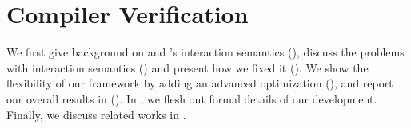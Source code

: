 \chapter{\;\;\;\;Compiler Verification}
\label{sec:compiler}

We first give background on \cc{} and \ccc{}'s interaction semantics (), discuss the problems with interaction semantics () and present how we fixed it ().
We show the flexibility of our framework by adding an advanced optimization (), and report our overall results in ().
In , we flesh out formal details of our development.
Finally, we discuss related works in .












